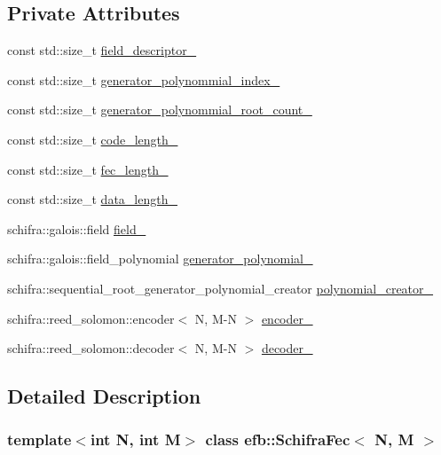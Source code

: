 \subsection*{Private Attributes}
\begin{DoxyCompactItemize}
\item 
const std::size\_\-t \hyperlink{classefb_1_1SchifraFec_aab1a6051362d9a8b9dc1bf66162743ba}{field\_\-descriptor\_\-}
\item 
const std::size\_\-t \hyperlink{classefb_1_1SchifraFec_a0151caad93dcee8fd76042845c7761d1}{generator\_\-polynommial\_\-index\_\-}
\item 
const std::size\_\-t \hyperlink{classefb_1_1SchifraFec_a187b4bde8c8d1626ee351ad9d8a10efb}{generator\_\-polynommial\_\-root\_\-count\_\-}
\item 
const std::size\_\-t \hyperlink{classefb_1_1SchifraFec_aec880d94a65f32e64736d21ecc62caee}{code\_\-length\_\-}
\item 
const std::size\_\-t \hyperlink{classefb_1_1SchifraFec_a560cb28c8a918c24356967a3c35604ad}{fec\_\-length\_\-}
\item 
const std::size\_\-t \hyperlink{classefb_1_1SchifraFec_a780eb0b73c725bab3470002b4746d07e}{data\_\-length\_\-}
\item 
schifra::galois::field \hyperlink{classefb_1_1SchifraFec_a770e111002e7a8b19041c4f3a972b2c1}{field\_\-}
\item 
schifra::galois::field\_\-polynomial \hyperlink{classefb_1_1SchifraFec_a80fe940d7742c12811d27cbb50d605dc}{generator\_\-polynomial\_\-}
\item 
schifra::sequential\_\-root\_\-generator\_\-polynomial\_\-creator \hyperlink{classefb_1_1SchifraFec_a6dd291fa5e301f1d88eba72e486c22d3}{polynomial\_\-creator\_\-}
\item 
schifra::reed\_\-solomon::encoder$<$ N, M-\/N $>$ \hyperlink{classefb_1_1SchifraFec_a48add19c7145ddef42b214f772508c0f}{encoder\_\-}
\item 
schifra::reed\_\-solomon::decoder$<$ N, M-\/N $>$ \hyperlink{classefb_1_1SchifraFec_acddab8a0f72a511d8b03ffecfe77735a}{decoder\_\-}
\end{DoxyCompactItemize}


\subsection{Detailed Description}
\subsubsection*{template$<$int N, int M$>$ class efb::SchifraFec$<$ N, M $>$}


